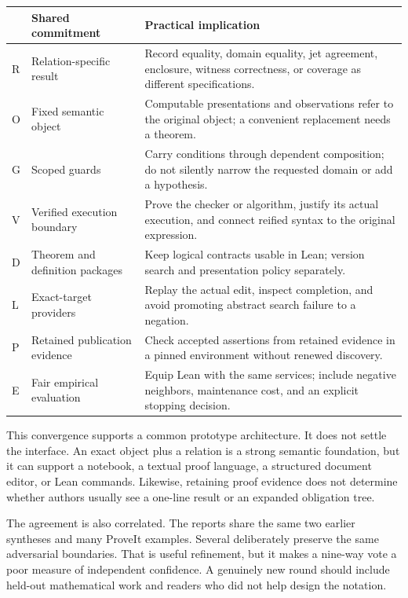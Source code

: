 \documentclass[11pt,letterpaper]{article}
\begin{document}
\begin{center}\small
\begin{tabularx}{\textwidth}{@{}P{.3in}P{1.55in}Y@{}}
\toprule
 & Shared commitment & Practical implication\\
\midrule
R & Relation-specific result & Record equality, domain equality, jet agreement,
enclosure, witness correctness, or coverage as different specifications.\\
O & Fixed semantic object & Computable presentations and observations refer to
the original object; a convenient replacement needs a theorem.\\
G & Scoped guards & Carry conditions through dependent composition; do not
silently narrow the requested domain or add a hypothesis.\\
V & Verified execution boundary & Prove the checker or algorithm, justify its
actual execution, and connect reified syntax to the original expression.\\
D & Theorem and definition packages & Keep logical contracts usable in Lean;
version search and presentation policy separately.\\
L & Exact-target providers & Replay the actual edit, inspect completion, and
avoid promoting abstract search failure to a negation.\\
P & Retained publication evidence & Check accepted assertions from retained
evidence in a pinned environment without renewed discovery.\\
E & Fair empirical evaluation & Equip Lean with the same services; include
negative neighbors, maintenance cost, and an explicit stopping decision.\\
\bottomrule
\end{tabularx}
\end{center}

This convergence supports a common prototype architecture. It does not settle
the interface. An exact object plus a relation is a strong semantic foundation,
but it can support a notebook, a textual proof language, a structured document
editor, or Lean commands. Likewise, retaining proof evidence does not determine
whether authors usually see a one-line result or an expanded obligation tree.

The agreement is also correlated. The reports share the same two earlier
syntheses and many ProveIt examples. Several deliberately preserve the same
adversarial boundaries. That is useful refinement, but it makes a nine-way vote
a poor measure of independent confidence. A genuinely new round should include
held-out mathematical work and readers who did not help design the notation.
\end{document}
